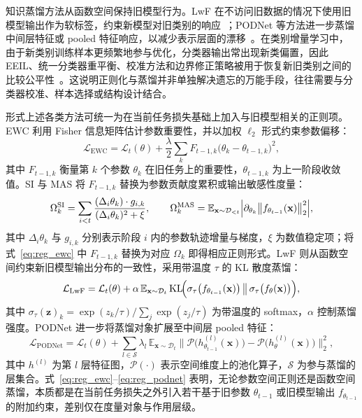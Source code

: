 知识蒸馏方法从函数空间保持旧模型行为。LwF 在不访问旧数据的情况下使用旧模型输出作为软标签，约束新模型对旧类别的响应~\citep{li2017learning}；PODNet 等方法进一步蒸馏中间层特征或 pooled 特征响应，以减少表示层面的漂移~\citep{Douillard_Cord_Ollion_Robert_Valle_2020}。在类别增量学习中，由于新类别训练样本更频繁地参与优化，分类器输出常出现新类偏置，因此 EEIL、统一分类器重平衡、校准方法和边界修正策略被用于恢复新旧类别之间的比较公平性~\citep{castro2018end,hou2019learning,zhu2021calibration,zhu2023imitating}。这说明正则化与蒸馏并非单独解决遗忘的万能手段，往往需要与分类器校准、样本选择或结构设计结合。

形式上述各类方法可统一为在当前任务损失基础上加入与旧模型相关的正则项。EWC 利用 Fisher 信息矩阵估计参数重要性，并以加权 $\ell_2$ 形式约束参数偏移：
\begin{equation}
\mathcal{L}_{\mathrm{EWC}}=\mathcal{L}_t(\theta)+\frac{\lambda}{2}\sum_{k}F_{t-1,k}\bigl(\theta_k-\theta_{t-1,k}\bigr)^2,
\label{eq:reg_ewc}
\end{equation}
其中 $F_{t-1,k}$ 衡量第 $k$ 个参数 $\theta_k$ 在旧任务上的重要性，$\theta_{t-1,k}$ 为上一阶段收敛值。SI 与 MAS 将 $F_{t-1,k}$ 替换为参数贡献度累积或输出敏感性度量：
\begin{equation}
\Omega_k^{\mathrm{SI}}=\sum_{i<t}\frac{(\Delta_i\theta_k)\cdot g_{i,k}}{(\Delta_i\theta_k)^2+\xi},\qquad
\Omega_k^{\mathrm{MAS}}=\mathbb{E}_{\mathbf{x}\sim\mathcal{D}_{<t}}\Bigl|\partial_{\theta_k}\bigl\|f_{\theta_{t-1}}(\mathbf{x})\bigr\|_2^2\Bigr|,
\label{eq:reg_si_mas}
\end{equation}
其中 $\Delta_i\theta_k$ 与 $g_{i,k}$ 分别表示阶段 $i$ 内的参数轨迹增量与梯度，$\xi$ 为数值稳定项；将式~\eqref{eq:reg_ewc} 中 $F_{t-1,k}$ 替换为对应 $\Omega_k$ 即得相应正则形式。LwF 则从函数空间约束新旧模型输出分布的一致性，采用带温度 $\tau$ 的 KL 散度蒸馏：
\begin{equation}
\mathcal{L}_{\mathrm{LwF}}=\mathcal{L}_t(\theta)+\alpha\,\mathbb{E}_{\mathbf{x}\sim\mathcal{D}_t}\,\mathrm{KL}\!\Bigl(\sigma_\tau\bigl(f_{\theta_{t-1}}(\mathbf{x})\bigr)\,\bigl\|\,\sigma_\tau\bigl(f_\theta(\mathbf{x})\bigr)\Bigr),
\label{eq:reg_lwf}
\end{equation}
其中 $\sigma_\tau(\mathbf{z})_k=\exp(z_k/\tau)/\sum_j\exp(z_j/\tau)$ 为带温度的 softmax，$\alpha$ 控制蒸馏强度。PODNet 进一步将蒸馏对象扩展至中间层 pooled 特征：
\begin{equation}
\mathcal{L}_{\mathrm{PODNet}}=\mathcal{L}_t(\theta)+\sum_{l\in\mathcal{S}}\lambda_l\,\mathbb{E}_{\mathbf{x}\sim\mathcal{D}_t}\bigl\|\mathcal{P}\bigl(h^{(l)}_{\theta_{t-1}}(\mathbf{x})\bigr)-\mathcal{P}\bigl(h^{(l)}_\theta(\mathbf{x})\bigr)\bigr\|_2^2,
\label{eq:reg_podnet}
\end{equation}
其中 $h^{(l)}$ 为第 $l$ 层特征图，$\mathcal{P}(\cdot)$ 表示空间维度上的池化算子，$\mathcal{S}$ 为参与蒸馏的层集合。式~\eqref{eq:reg_ewc}--\eqref{eq:reg_podnet} 表明，无论参数空间正则还是函数空间蒸馏，本质都是在当前任务损失之外引入若干基于旧参数 $\theta_{t-1}$ 或旧模型输出 $f_{\theta_{t-1}}$ 的附加约束，差别仅在度量对象与作用层级。

